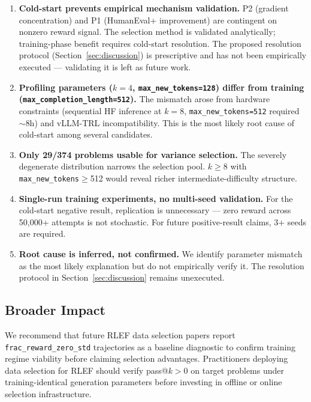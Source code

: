\begin{enumerate}
\item \textbf{Cold-start prevents empirical mechanism validation.} P2 (gradient concentration) and P1 (HumanEval+ improvement) are contingent on nonzero reward signal. The selection method is validated analytically; training-phase benefit requires cold-start resolution. The proposed resolution protocol (Section~\ref{sec:discussion}) is prescriptive and has not been empirically executed --- validating it is left as future work.

\item \textbf{Profiling parameters ($k=4$, \texttt{max\_new\_tokens=128}) differ from training (\texttt{max\_completion\_length=512}).} The mismatch arose from hardware constraints (sequential HF inference at $k=8$, \texttt{max\_new\_tokens=512} required $\sim$8h) and vLLM-TRL incompatibility. This is the most likely root cause of cold-start among several candidates.

\item \textbf{Only 29/374 problems usable for variance selection.} The severely degenerate distribution narrows the selection pool. $k\geq8$ with \texttt{max\_new\_tokens}$\geq$512 would reveal richer intermediate-difficulty structure.

\item \textbf{Single-run training experiments, no multi-seed validation.} For the cold-start negative result, replication is unnecessary --- zero reward across 50,000+ attempts is not stochastic. For future positive-result claims, 3+ seeds are required.

\item \textbf{Root cause is inferred, not confirmed.} We identify parameter mismatch as the most likely explanation but do not empirically verify it. The resolution protocol in Section~\ref{sec:discussion} remains unexecuted.
\end{enumerate}

\subsection{Broader Impact}

We recommend that future RLEF data selection papers report \texttt{frac\_reward\_zero\_std} trajectories as a baseline diagnostic to confirm training regime viability before claiming selection advantages. Practitioners deploying data selection for RLEF should verify pass@$k > 0$ on target problems under training-identical generation parameters before investing in offline or online selection infrastructure.
